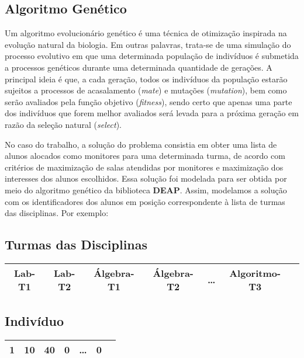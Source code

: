 \documentclass[a4paper,12pt]{article}
\begin{document}
\subsection{Algoritmo Genético}

Um algoritmo evolucionário genético é uma técnica de otimização inspirada na evolução natural da biologia. Em outras palavras, trata-se de uma simulação do processo evolutivo em que uma determinada população de indivíduos é submetida a processos genéticos durante uma determinada quantidade de gerações. A principal ideia é que, a cada geração, todos os indivíduos da população estarão sujeitos a processos de acasalamento (\textit{mate}) e mutações (\textit{mutation}), bem como serão avaliados pela função objetivo (\textit{fitness}), sendo certo que apenas uma parte dos indivíduos que forem melhor avaliados será levada para a próxima geração em razão da seleção natural (\textit{select}).

No caso do trabalho, a solução do problema consistia em obter uma lista de alunos alocados como monitores para uma determinada turma, de acordo com critérios de maximização de salas atendidas por monitores e maximização dos interesses dos alunos escolhidos. Essa solução foi modelada para ser obtida por meio do algoritmo genético da biblioteca \textbf{DEAP}. Assim, modelamos a solução com os identificadores dos alunos em posição correspondente à lista de turmas das disciplinas. Por exemplo:

\subsection*{Turmas das Disciplinas}

\begin{table}[H]
    \centering
    \begin{tabular}{|c|c|c|c|c|c|c|}
        \hline
        Lab-T1 & Lab-T2 & Álgebra-T1 & Álgebra-T2 & \dots & Algoritmo-T3 \\
        \hline
    \end{tabular}
\end{table}

\subsection*{Indivíduo}

\begin{table}[H]
    \centering
    \begin{tabular}{|c|c|c|c|c|c|c|}
        \hline
        1 & 10 & 40 & 0 & \dots & 0 \\
        \hline
    \end{tabular}
\end{table}
\end{document}
